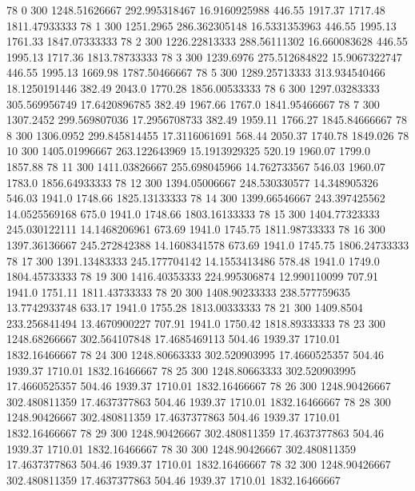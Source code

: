 78  0  300  1248.51626667  292.995318467  16.9160925988  446.55  1917.37  1717.48  1811.47933333 
78  1  300  1251.2965  286.362305148  16.5331353963  446.55  1995.13  1761.33  1847.07333333 
78  2  300  1226.22813333  288.56111302  16.660083628  446.55  1995.13  1717.36  1813.78733333 
78  3  300  1239.6976  275.512684822  15.9067322747  446.55  1995.13  1669.98  1787.50466667 
78  5  300  1289.25713333  313.934540466  18.1250191446  382.49  2043.0  1770.28  1856.00533333 
78  6  300  1297.03283333  305.569956749  17.6420896785  382.49  1967.66  1767.0  1841.95466667 
78  7  300  1307.2452  299.569807036  17.2956708733  382.49  1959.11  1766.27  1845.84666667 
78  8  300  1306.0952  299.845814455  17.3116061691  568.44  2050.37  1740.78  1849.026 
78  10  300  1405.01996667  263.122643969  15.1913929325  520.19  1960.07  1799.0  1857.88 
78  11  300  1411.03826667  255.698045966  14.762733567  546.03  1960.07  1783.0  1856.64933333 
78  12  300  1394.05006667  248.530330577  14.348905326  546.03  1941.0  1748.66  1825.13133333 
78  14  300  1399.66546667  243.397425562  14.0525569168  675.0  1941.0  1748.66  1803.16133333 
78  15  300  1404.77323333  245.030122111  14.1468206961  673.69  1941.0  1745.75  1811.98733333 
78  16  300  1397.36136667  245.272842388  14.1608341578  673.69  1941.0  1745.75  1806.24733333 
78  17  300  1391.13483333  245.177704142  14.1553413486  578.48  1941.0  1749.0  1804.45733333 
78  19  300  1416.40353333  224.995306874  12.990110099  707.91  1941.0  1751.11  1811.43733333 
78  20  300  1408.90233333  238.577759635  13.7742933748  633.17  1941.0  1755.28  1813.00333333 
78  21  300  1409.8504  233.256841494  13.4670900227  707.91  1941.0  1750.42  1818.89333333 
78  23  300  1248.68266667  302.564107848  17.4685469113  504.46  1939.37  1710.01  1832.16466667 
78  24  300  1248.80663333  302.520903995  17.4660525357  504.46  1939.37  1710.01  1832.16466667 
78  25  300  1248.80663333  302.520903995  17.4660525357  504.46  1939.37  1710.01  1832.16466667 
78  26  300  1248.90426667  302.480811359  17.4637377863  504.46  1939.37  1710.01  1832.16466667 
78  28  300  1248.90426667  302.480811359  17.4637377863  504.46  1939.37  1710.01  1832.16466667 
78  29  300  1248.90426667  302.480811359  17.4637377863  504.46  1939.37  1710.01  1832.16466667 
78  30  300  1248.90426667  302.480811359  17.4637377863  504.46  1939.37  1710.01  1832.16466667 
78  32  300  1248.90426667  302.480811359  17.4637377863  504.46  1939.37  1710.01  1832.16466667 

